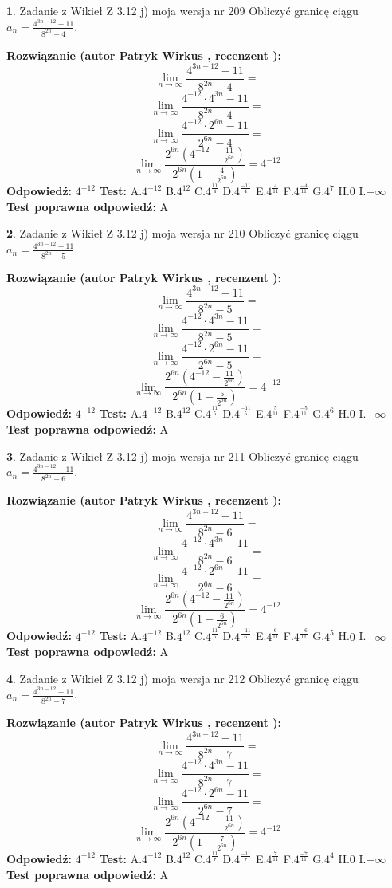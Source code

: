 \documentclass[12pt, a4paper]{article}
\theoremstyle{definition} %
\newtheorem{zad}{}
\newcommand{\zadStart}[1]{\begin{zad}#1\newline}
\newcommand{\zadStop}{\end{zad}}
\newcommand{\rozwStart}[2]{\noindent \textbf{Rozwiązanie (autor #1 , recenzent #2): }\newline}
\newcommand{\rozwStop}{\newline}
\newcommand{\odpStart}{\noindent \textbf{Odpowiedź:}\newline}
\newcommand{\odpStop}{\newline}
\newcommand{\testStart}{\noindent \textbf{Test:}\newline}
\newcommand{\testStop}{\newline}
\newcommand{\kluczStart}{\noindent \textbf{Test poprawna odpowiedź:}\newline}
\newcommand{\kluczStop}{\newline}
\begin{document}
\zadStart{Zadanie z Wikieł Z 3.12 j) moja wersja nr 209}
Obliczyć granicę ciągu $a_{n}=\frac{4^{3n-12}-11}{8^{2n}-4}$.
\zadStop
\rozwStart{Patryk Wirkus}{}
$$\lim\limits_{n\to\infty}\frac{4^{3n-12}-11}{8^{2n}-4}=$$
$$\lim\limits_{n\to\infty}\frac{4^{-12} \cdot 4^{3n}-11}{8^{2n}-4}=$$
$$\lim\limits_{n\to\infty}\frac{4^{-12} \cdot 2^{6n}-11}{2^{6n}-4}=$$
$$\lim\limits_{n\to\infty}\frac{2^{6n}(4^{-12} - \frac{11}{2^{6n}})}{2^{6n}(1-\frac{4}{2^{6n}})}= 4^{-12}$$
\rozwStop
\odpStart
$4^{-12}$
\odpStop
\testStart
A.$4^{-12}$
B.$4^{12}$
C.$4^{\frac{11}{4}}$
D.$4^{\frac{-11}{4}}$
E.$4^{\frac{4}{11}}$
F.$4^{\frac{-4}{11}}$
G.$4^{7}$
H.$0$
I.$-\infty$
\testStop
\kluczStart
A
\kluczStop



\zadStart{Zadanie z Wikieł Z 3.12 j) moja wersja nr 210}
Obliczyć granicę ciągu $a_{n}=\frac{4^{3n-12}-11}{8^{2n}-5}$.
\zadStop
\rozwStart{Patryk Wirkus}{}
$$\lim\limits_{n\to\infty}\frac{4^{3n-12}-11}{8^{2n}-5}=$$
$$\lim\limits_{n\to\infty}\frac{4^{-12} \cdot 4^{3n}-11}{8^{2n}-5}=$$
$$\lim\limits_{n\to\infty}\frac{4^{-12} \cdot 2^{6n}-11}{2^{6n}-5}=$$
$$\lim\limits_{n\to\infty}\frac{2^{6n}(4^{-12} - \frac{11}{2^{6n}})}{2^{6n}(1-\frac{5}{2^{6n}})}= 4^{-12}$$
\rozwStop
\odpStart
$4^{-12}$
\odpStop
\testStart
A.$4^{-12}$
B.$4^{12}$
C.$4^{\frac{11}{5}}$
D.$4^{\frac{-11}{5}}$
E.$4^{\frac{5}{11}}$
F.$4^{\frac{-5}{11}}$
G.$4^{6}$
H.$0$
I.$-\infty$
\testStop
\kluczStart
A
\kluczStop



\zadStart{Zadanie z Wikieł Z 3.12 j) moja wersja nr 211}
Obliczyć granicę ciągu $a_{n}=\frac{4^{3n-12}-11}{8^{2n}-6}$.
\zadStop
\rozwStart{Patryk Wirkus}{}
$$\lim\limits_{n\to\infty}\frac{4^{3n-12}-11}{8^{2n}-6}=$$
$$\lim\limits_{n\to\infty}\frac{4^{-12} \cdot 4^{3n}-11}{8^{2n}-6}=$$
$$\lim\limits_{n\to\infty}\frac{4^{-12} \cdot 2^{6n}-11}{2^{6n}-6}=$$
$$\lim\limits_{n\to\infty}\frac{2^{6n}(4^{-12} - \frac{11}{2^{6n}})}{2^{6n}(1-\frac{6}{2^{6n}})}= 4^{-12}$$
\rozwStop
\odpStart
$4^{-12}$
\odpStop
\testStart
A.$4^{-12}$
B.$4^{12}$
C.$4^{\frac{11}{6}}$
D.$4^{\frac{-11}{6}}$
E.$4^{\frac{6}{11}}$
F.$4^{\frac{-6}{11}}$
G.$4^{5}$
H.$0$
I.$-\infty$
\testStop
\kluczStart
A
\kluczStop



\zadStart{Zadanie z Wikieł Z 3.12 j) moja wersja nr 212}
Obliczyć granicę ciągu $a_{n}=\frac{4^{3n-12}-11}{8^{2n}-7}$.
\zadStop
\rozwStart{Patryk Wirkus}{}
$$\lim\limits_{n\to\infty}\frac{4^{3n-12}-11}{8^{2n}-7}=$$
$$\lim\limits_{n\to\infty}\frac{4^{-12} \cdot 4^{3n}-11}{8^{2n}-7}=$$
$$\lim\limits_{n\to\infty}\frac{4^{-12} \cdot 2^{6n}-11}{2^{6n}-7}=$$
$$\lim\limits_{n\to\infty}\frac{2^{6n}(4^{-12} - \frac{11}{2^{6n}})}{2^{6n}(1-\frac{7}{2^{6n}})}= 4^{-12}$$
\rozwStop
\odpStart
$4^{-12}$
\odpStop
\testStart
A.$4^{-12}$
B.$4^{12}$
C.$4^{\frac{11}{7}}$
D.$4^{\frac{-11}{7}}$
E.$4^{\frac{7}{11}}$
F.$4^{\frac{-7}{11}}$
G.$4^{4}$
H.$0$
I.$-\infty$
\testStop
\kluczStart
A
\kluczStop
\end{document}

